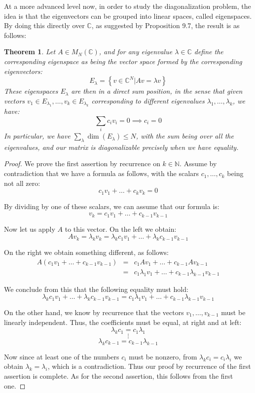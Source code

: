 \documentclass[12pt]{amsbook}
\newtheorem{theorem}{Theorem}[chapter]
\begin{document}
At a more advanced level now, in order to study the diagonalization problem, the idea is that the eigenvectors can be grouped into linear spaces, called eigenspaces. By doing this directly over $\mathbb C$, as suggested by Proposition 9.7, the result is as follows:

\begin{theorem}
Let $A\in M_N(\mathbb C)$, and for any eigenvalue $\lambda\in\mathbb C$ define the corresponding eigenspace as being the vector space formed by the corresponding eigenvectors:
$$E_\lambda=\left\{v\in\mathbb C^N\Big|Av=\lambda v\right\}$$
These eigenspaces $E_\lambda$ are then in a direct sum position, in the sense that given vectors $v_1\in E_{\lambda_1},\ldots,v_k\in E_{\lambda_k}$ corresponding to different eigenvalues $\lambda_1,\ldots,\lambda_k$, we have:
$$\sum_ic_iv_i=0\implies c_i=0$$
In particular, we have $\sum_\lambda\dim(E_\lambda)\leq N$, with the sum being over all the eigenvalues, and our matrix is diagonalizable precisely when we have equality.
\end{theorem}

\begin{proof}
We prove the first assertion by recurrence on $k\in\mathbb N$. Assume by contradiction that we have a formula as follows, with the scalars $c_1,\ldots,c_k$ being not all zero:
$$c_1v_1+\ldots+c_kv_k=0$$

By dividing by one of these scalars, we can assume that our formula is:
$$v_k=c_1v_1+\ldots+c_{k-1}v_{k-1}$$

Now let us apply $A$ to this vector. On the left we obtain:
$$Av_k
=\lambda_kv_k
=\lambda_kc_1v_1+\ldots+\lambda_kc_{k-1}v_{k-1}$$

On the right we obtain something different, as follows:
\begin{eqnarray*}
A(c_1v_1+\ldots+c_{k-1}v_{k-1})
&=&c_1Av_1+\ldots+c_{k-1}Av_{k-1}\\
&=&c_1\lambda_1v_1+\ldots+c_{k-1}\lambda_{k-1}v_{k-1}
\end{eqnarray*}

We conclude from this that the following equality must hold:
$$\lambda_kc_1v_1+\ldots+\lambda_kc_{k-1}v_{k-1}=c_1\lambda_1v_1+\ldots+c_{k-1}\lambda_{k-1}v_{k-1}$$

On the other hand, we know by recurrence that the vectors $v_1,\ldots,v_{k-1}$ must be linearly independent. Thus, the coefficients must be equal, at right and at left:
$$\lambda_kc_1=c_1\lambda_1$$
$$\vdots$$
$$\lambda_kc_{k-1}=c_{k-1}\lambda_{k-1}$$

Now since at least one of the numbers $c_i$ must be nonzero, from $\lambda_kc_i=c_i\lambda_i$ we obtain $\lambda_k=\lambda_i$, which is a contradiction. Thus our proof by recurrence of the first assertion is complete. As for the second assertion, this follows from the first one.
\end{proof}
\end{document}
